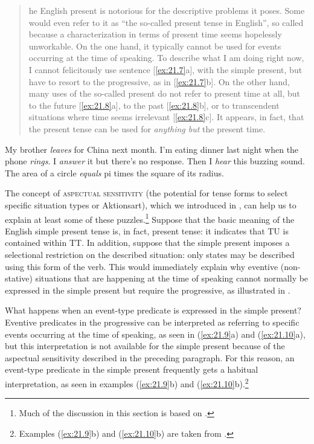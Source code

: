 \begin{quote}
	\relax [T]he English present is notorious for the descriptive problems it poses. Some would even refer to it as “the so-called present tense in English”, so called because a characterization in terms of present time seems hopelessly unworkable. On the one hand, it typically cannot be used for events occurring at the time of speaking. To describe what I am doing right now, I cannot felicitously use sentence [\ref{ex:21.7}a], with the simple present, but have to resort to the progressive, as in [\ref{ex:21.7}b]. On the other hand, many uses of the so-called present do not refer to present time at all, but to the future [\ref{ex:21.8}a], to the past [\ref{ex:21.8}b], or to transcendent situations where time seems irrelevant [\ref{ex:21.8}c]. It appears, in fact, that the present tense can be used for \textit{anything but} the present time.
\end{quote}

\ea \label{ex:21.7}
                       \z
\z

\ea \label{ex:21.8}
\ea  My brother \textit{leaves} for China next month.
\ex  I’m eating dinner last night when the phone \textit{rings}. I \textit{answer} it but there’s no response. Then I \textit{hear} this buzzing sound.
\ex  The area of a circle \textit{equals} pi times the square of its radius. 
\z \z


The concept of \textsc{aspectual sensitivity} (the potential for tense forms to select specific situation types or Aktionsart), which we introduced in , can help us to explain at least some of these puzzles.\footnote{Much of the discussion in this section is based on \citet{Michaelis2006}.} Suppose that the basic meaning of the English simple present tense is, in fact, present tense: it indicates that TU is contained within TT. In addition, suppose that the simple present imposes a selectional restriction on the described situation: only states may be described using this form of the verb. This would immediately explain why eventive (non-stative) situations that are happening at the time of speaking cannot normally be expressed in the simple present but require the progressive, as illustrated in .



What happens when an event-type predicate is expressed in the simple pres\-ent? Eventive predicates in the progressive can be interpreted as referring to specific events occurring at the time of speaking, as seen in (\ref{ex:21.9}a) and (\ref{ex:21.10}a), but this interpretation is not available for the simple present because of the aspectual sensitivity described in the preceding paragraph. For this reason, an event-type predicate in the simple present frequently gets a habitual interpretation, as seen in examples (\ref{ex:21.9}b) and (\ref{ex:21.10}b).\footnote{Examples (\ref{ex:21.9}b) and (\ref{ex:21.10}b) are taken from \citet[185]{Smith1997}.}


